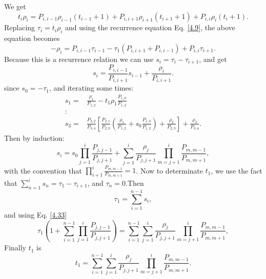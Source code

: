  We get
 \begin{equation}
 t_i \rho_i =P_{i,i-1}\rho_{i-1}(t_{i-1}+1) + P_{i,i+1}\rho_{i+1}(t_{i+1}+1) + P_{i,i}\rho_{i}(t_{i}+1).
 \end{equation}
 Replacing $\tau_{i}=t_i \rho_i$ and using the recurrence equation Eq. \eqref{4.9}, the above equation becomes
 \begin{equation}
 -\rho_i =P_{i,i-1}\tau_{i-1}-\tau_1(P_{i,i+1}+P_{i,i-1})+P_{i,i}\tau_{i+1}.
 \end{equation}
 Because this is a recurrence relation we can use $s_{i}=\tau_i -\tau_{i+1}$, and get
 \begin{equation}
 s_{i}=\frac{P_{i,i-1}}{P_{i,i+1}}s_{i-1}+\frac{\rho_i}{P_{i,i+1}}.
 \end{equation}
 since $s_{0}=-\tau_1$, and iterating some times:
 \begin{equation*}
 \begin{split}
s_1 = & \frac{\rho_1}{P_{1,2}} - t_1 \rho_1\frac{P_{1,0}}{P_{1,2}} \\
:\\
s_3 =& \frac{P_{3,2}}{P_{3,4}}\left[\frac{P_{2,1}}{P_{2,3}}\left( \frac{\rho_{1}}{P_{1,2}}+  s_0 \frac{P_{1,0}}{P_{1,2}}\right)+ \frac{\rho_2}{P_{2,3}}\right] + \frac{\rho_{3}}{P_{3,4}}.
 \end{split}
\end{equation*}
Then by induction:
\begin{equation}\label{4.33}
s_{i}=s_0 \prod\limits_{j=1}^{i}\frac{P_{j,j-1}}{P_{j,j+1}} + \sum\limits_{j=1}^{i}\frac{\rho_j}{P_{j,j+1}}\prod\limits_{m=j+1}^{i}\frac{P_{m,m-1}}{P_{m,m+1}},
\end{equation}
with the convention that $\prod\limits_{i+1}^{i}\frac{P_{m,m-1}}{P_{m,m+1}} =1$.
Now to determinate $t_1$, we use the fact that $\sum\limits_{n=1}^{i}s_n = \tau_1-\tau_{i+1}$, and $\tau_n=0$.Then 
\begin{equation}
\tau_1=\sum\limits_{i=1}^{n-1}s_i,
\end{equation}
and using Eq. \eqref{4.33}
\begin{equation}
\tau_1\left(1+ \sum\limits_{i=1}^{n-1}\prod\limits_{j=1}^{i}\frac{P_{j,j-1}}{P_{j,j+1}}\right)=\sum\limits_{i=1}^{n-1}\sum\limits_{j=1}^{i}\frac{\rho_j}{P_{j,j+1}}\prod\limits_{m=j+1}^{i}\frac{P_{m,m-1}}{P_{m,m+1}},
\end{equation}
Finally $t_{1}$ is
\begin{equation}\label{4.36}
t_1=\sum\limits_{i=1}^{n-1}\sum\limits_{j=1}^{i}\frac{\rho_j}{P_{j,j+1}}\prod\limits_{m=j+1}^{i}\frac{P_{m,m-1}}{P_{m,m+1}}.
\end{equation}
